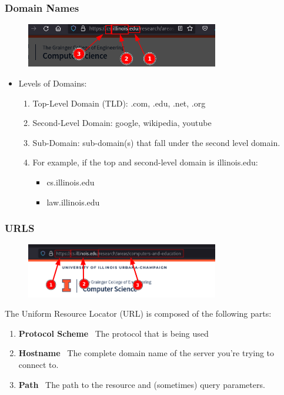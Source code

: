 \documentclass{beamer}
\begin{document}
%
%
\begin{frame}[fragile]
    \frametitle{Domain Names}
    \begin{figure}
        \includegraphics[width=0.75\textwidth]{./imgs/domain.png}
    \end{figure}
    \begin{itemize}
        \item Levels of Domains:
        \begin{enumerate}
            \item Top-Level Domain (TLD): .com, .edu, .net, .org 
                \pause
            \item Second-Level Domain: google, wikipedia, youtube
                \pause
            \item Sub-Domain: sub-domain(s) that fall under the second level domain. 
                \pause
            \item For example, if the top and second-level domain is illinois.edu:
            \begin{itemize}
                \item cs.illinois.edu
                \item law.illinois.edu
            \end{itemize}
        \end{enumerate}
    \end{itemize}
\end{frame}

%
%
\begin{frame}[fragile]
    \frametitle{URLS}
    \begin{figure}
        \includegraphics[width=0.75\textwidth]{./imgs/url.png}
    \end{figure}
    The Uniform Resource Locator (URL) is composed of the following parts:
    \begin{enumerate}
        \item \textbf{Protocol Scheme} \textrightarrow \  The protocol that is being used 
        \item \textbf{Hostname} \textrightarrow \ The complete domain name of the server you're trying to connect to.
        \item \textbf{Path} \textrightarrow \ The path to the resource and (sometimes) query parameters.
    \end{enumerate}
\end{frame}
\end{document}
